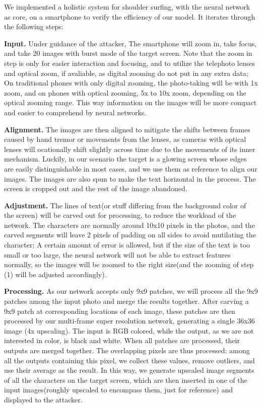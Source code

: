We implemented a holistic system for shoulder surfing, with the neural network as core, on a smartphone to verify the efficiency of our model. It iterates through the following steps: 

\vspace{1mm}
\noindent
\textbf{Input.} Under guidance of the attacker, The smartphone will zoom in, take focus, and take 20 images with burst mode of the target screen. Note that the zoom in step is only for easier interaction and focusing, and to utilize the telephoto lenses and optical zoom, if avaliable, as digital zooming do not put in any extra data; On traditional phones with only digital zooming, the photo-taking will be with 1x zoom, and on phones with optical zooming, 5x to 10x zoom, depending on the optical zooming range. This way information on the images will be more compact and easier to comprehend by neural networks.

\vspace{1mm}
\noindent
\textbf{Alignment.} The images are then aligned to mitigate the shifts between frames caused by hand tremor or movements from the lenses, as cameras with optical lenses will ocationally shift slightly across time due to the movements of its inner mechanism. Luckily, in our scenario the target is a glowing screen whose edges are easily distinguishable in most cases, and we use them as reference to align our images. The images are also spun to make the text horizontal in the process. The screen is cropped out and the rest of the image abandoned.


\vspace{1mm}
\noindent
\textbf{Adjustment.} The lines of text(or stuff differing from the background color of the screen) will be carved out for processing, to reduce the workload of the network. The characters are normally around 10x10 pixels in the photos, and the carved segments will leave 2 pixels of padding on all sides to avoid mutilating the character; A certain amount of error is allowed, but if the size of the text is too small or too large, the neural network will not be able to extract features normally, so the images will be zoomed to the right size(and the zooming of step (1) will be adjusted accordingly).


\vspace{1mm}
\noindent
\textbf{Processing.} As our network accepts only 9x9 patches, we will process all the 9x9 patches among the input photo and merge the results together. After carving a 9x9 patch at corresponding locations of each image, these patches are then processed by our multi-frame super resolution network, generating a single 36x36 image (4x upscaling). The input is RGB colored, while the output, as we are not interested in color, is black and white. When all patches are processed, their outputs are merged together. The overlapping pixels are thus processed: among all the outputs containing this pixel, we collect these values, remove outliers, and use their average as the result. In this way, we generate upscaled image segments of all the characters on the target screen, which are then inserted in one of the input images(roughly upscaled to encompass them, just for reference) and displayed to the attacker.

